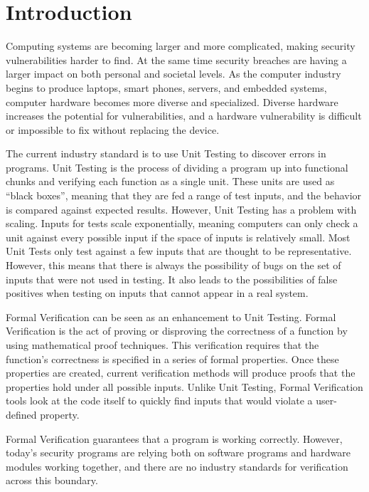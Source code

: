 \chapter{Introduction}

Computing systems are becoming larger and more complicated, making security
vulnerabilities harder to find.
At the same time security breaches are having a larger impact on both personal and societal levels.
As the computer industry begins to produce laptops, smart phones, servers, and embedded systems, computer
hardware becomes more diverse and specialized. Diverse hardware increases the
potential for vulnerabilities, and a hardware vulnerability is difficult or
impossible to fix without replacing the device. 

The current industry standard is to use Unit Testing to discover errors in programs. 
Unit Testing is the process of dividing a program up into functional chunks and
verifying each function as a single unit. 
These units are used as ``black boxes'', meaning that they are fed a range
of test inputs, and the behavior is compared against expected results.
However, Unit Testing has a problem with scaling. 
Inputs for tests scale exponentially, meaning computers can only check a unit against
every possible input if the space of inputs is relatively small. 
Most Unit Tests only test against a few inputs that are thought to be
representative. 
However, this means that there is always the possibility of bugs
on the set of inputs that were not used in testing.
It also leads to the possibilities of false positives when testing on inputs that cannot appear in a real system.

Formal Verification can be seen as an enhancement to Unit Testing. 
Formal Verification is the act of proving or disproving the correctness of a
function by using mathematical proof techniques. 
This verification requires that the function's correctness is specified in a
series of formal properties.
Once these properties are created, current verification methods 
will produce proofs that the properties hold under all possible inputs.
Unlike Unit Testing, Formal Verification tools look at the code itself to quickly find inputs that would violate a user-defined property. 

Formal Verification guarantees that a program is working correctly. 
However, today's security programs are relying both on software programs and
hardware modules working together, and there are no industry standards for
 verification across this boundary.

